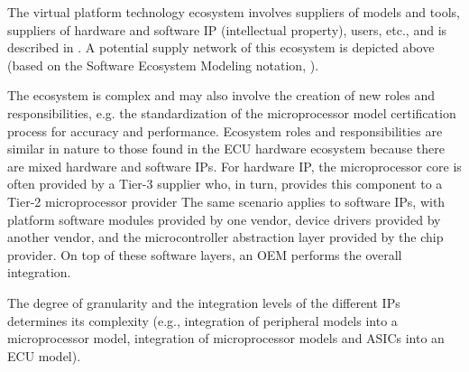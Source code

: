 \small
The virtual platform technology ecosystem involves suppliers of models and tools, suppliers of hardware and software IP (intellectual property), users, etc., and is described in \cite{Knauss2014d}.
A potential supply network of this ecosystem is depicted above (based on the Software Ecosystem Modeling notation, \cite{Boucharas2009}).

The ecosystem is complex and may also involve the creation of new roles and responsibilities, e.g. the standardization of the microprocessor model certification process for accuracy and performance.
Ecosystem roles and responsibilities are similar in nature to those found in the ECU hardware ecosystem because there are mixed hardware and software IPs.
For hardware IP, the microprocessor core is often provided by a Tier-3 supplier who, in turn, provides this component to a Tier-2 microprocessor provider
The same scenario applies to software IPs, with platform software modules provided by one vendor, device drivers provided by another vendor, and the microcontroller abstraction layer provided by the chip provider.
On top of these software layers, an OEM performs the overall integration.

The degree of granularity and the integration levels of the different IPs determines its complexity (e.g., integration of peripheral models into a microprocessor model, integration of microprocessor models and ASICs into an ECU model).

